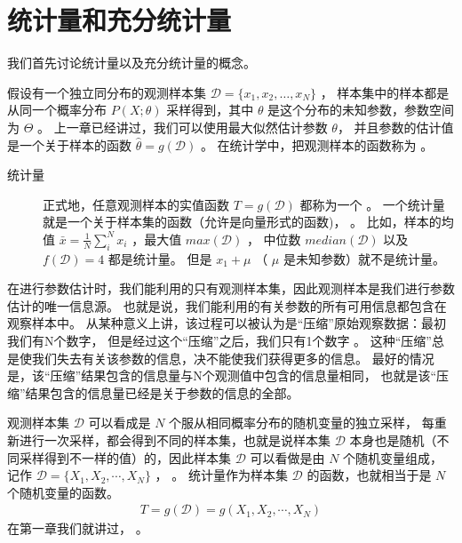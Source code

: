 \documentclass[letterpaper,10pt,english]{sphinxmanual}
\begin{document}
\section{统计量和充分统计量}
\label{\detokenize{_u63a8_u65ad_u4e0e_u68c0_u9a8c/content:id2}}
我们首先讨论统计量以及充分统计量的概念。

假设有一个独立同分布的观测样本集 \(\mathcal{D} = \{x_1,x_2,\dots,x_N\}\) ，
样本集中的样本都是从同一个概率分布
\(P(X;\theta)\) 采样得到，其中 \(\theta\) 是这个分布的未知参数，参数空间为 \(\Theta\) 。
上一章已经讲过，我们可以使用最大似然估计参数 \(\theta\)，
并且参数的估计值是一个关于样本的函数 \(\hat{\theta} = g(\mathcal{D})\) 。
在统计学中，把观测样本的函数称为 。
\begin{description}
\item[{统计量\label{\detokenize{_u63a8_u65ad_u4e0e_u68c0_u9a8c/content:term-0}}}] \leavevmode
正式地，任意观测样本的实值函数 \(T=g(\mathcal{D})\) 都称为一个  。
一个统计量就是一个关于样本集的函数（允许是向量形式的函数)， 。
比如，样本的均值 \(\bar{x}=\frac{1}{N}\sum_i^N x_i\) ，最大值 \(max(\mathcal{D})\)
， 中位数 \(median(\mathcal{D})\) 以及 \(f(\mathcal{D})=4\) 都是统计量。
但是 \(x_1+\mu\) （ \(\mu\) 是未知参数）就不是统计量。

\end{description}


在进行参数估计时，我们能利用的只有观测样本集，因此观测样本是我们进行参数估计的唯一信息源。
也就是说，我们能利用的有关参数的所有可用信息都包含在观察样本中。
从某种意义上讲，该过程可以被认为是“压缩”原始观察数据：最初我们有N个数字，
但是经过这个“压缩”之后，我们只有1个数字 。
这种“压缩”总是使我们失去有关该参数的信息，决不能使我们获得更多的信息。
最好的情况是，该“压缩”结果包含的信息量与N个观测值中包含的信息量相同，
也就是该“压缩”结果包含的信息量已经是关于参数的信息的全部。


观测样本集 \(\mathcal{D}\) 可以看成是 \(N\) 个服从相同概率分布的随机变量的独立采样，
每重新进行一次采样，都会得到不同的样本集，也就是说样本集 \(\mathcal{D}\)
本身也是随机（不同采样得到不一样的值）的，因此样本集 \(\mathcal{D}\)
可以看做是由 \(N\) 个随机变量组成，记作 \(\mathcal{D}=\{X_1,X_2,\cdots,X_N\}\)
， 。
统计量作为样本集 \(\mathcal{D}\) 的函数，也就相当于是 \(N\) 个随机变量的函数。
\begin{equation}\label{equation:推断与检验/content:推断与检验/content:0}
\begin{split}T = g(\mathcal{D}) = g(X_1,X_2,\cdots,X_N)\end{split}
\end{equation}
在第一章我们就讲过，
。
\end{document}
